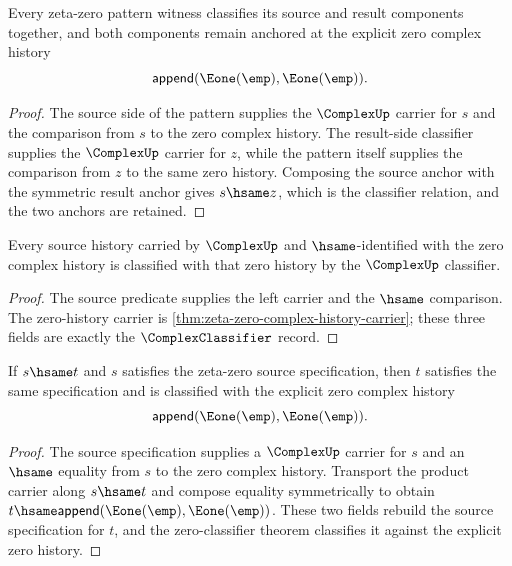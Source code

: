 \begin{theorem}
\label{thm:zeta-zero-pattern-spec-source-result-classifier}
Every zeta-zero pattern witness classifies its source and result components
together, and both components remain anchored at the explicit zero complex
history
$$
\mathsf{append}(\Eone(\emp),\Eone(\emp)).
$$
\end{theorem}
\begin{proof}
The source side of the pattern supplies the $\ComplexUp$ carrier for $s$
and the comparison from $s$ to the zero complex history. The result-side
classifier supplies the $\ComplexUp$ carrier for $z$, while the pattern
itself supplies the comparison from $z$ to the same zero history. Composing
the source anchor with the symmetric result anchor gives $s\hsame z$, which
is the classifier relation, and the two anchors are retained.
\end{proof}

\begin{theorem}
\label{thm:zeta-zero-source-spec-zero-classifier}
Every source history carried by \(\ComplexUp\) and \(\hsame\)-identified with the zero complex history is classified with that zero history by the \(\ComplexUp\) classifier.
\end{theorem}
\begin{proof}
The source predicate supplies the left carrier and the \(\hsame\) comparison. The zero-history carrier is \autoref{thm:zeta-zero-complex-history-carrier}; these three fields are exactly the \(\ComplexClassifier\) record.
\end{proof}

\begin{theorem}
\label{thm:zeta-zero-source-spec-hsame-transport-classifier}
If $s\hsame t$ and $s$ satisfies the zeta-zero source specification, then $t$
satisfies the same specification and is classified with the explicit zero
complex history
$$
\mathsf{append}(\Eone(\emp),\Eone(\emp)).
$$
\end{theorem}
\begin{proof}
The source specification supplies a $\ComplexUp$ carrier for $s$ and an
$\hsame$ equality from $s$ to the zero complex history. Transport the product
carrier along $s\hsame t$ and compose equality symmetrically to obtain
$t\hsame\mathsf{append}(\Eone(\emp),\Eone(\emp))$. These two fields rebuild the
source specification for $t$, and the zero-classifier theorem classifies it
against the explicit zero history.
\end{proof}

